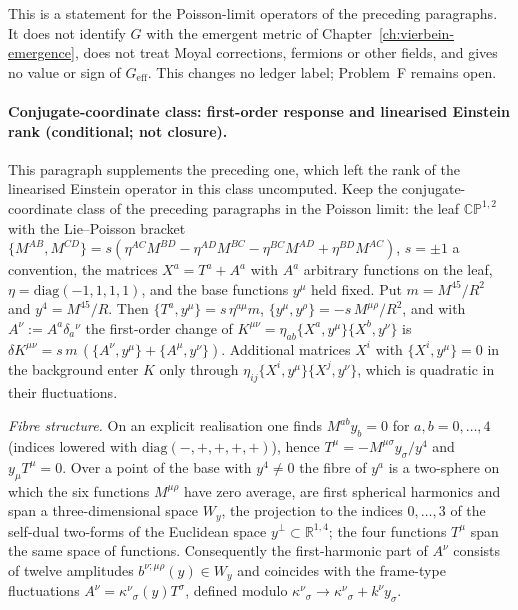 This is a statement for the Poisson-limit operators of the preceding paragraphs. It does not identify \(G\) with the emergent metric of Chapter~\ref{ch:vierbein-emergence}, does not treat Moyal corrections, fermions or other fields, and gives no value or sign of \(G_{\mathrm{eff}}\). This changes no ledger label; Problem~F remains open.

\paragraph{Conjugate-coordinate class: first-order response and linearised Einstein rank (conditional; not closure).}
This paragraph supplements the preceding one, which left the rank of the linearised Einstein operator in this class uncomputed. Keep the conjugate-coordinate class of the preceding paragraphs in the Poisson limit: the leaf \(\mathbb{CP}^{1,2}\) with the Lie--Poisson bracket \(\{M^{AB},M^{CD}\}=s(\eta^{AC}M^{BD}-\eta^{AD}M^{BC}-\eta^{BC}M^{AD}+\eta^{BD}M^{AC})\), \(s=\pm1\) a convention, the matrices \(X^a=T^a+A^a\) with \(A^a\) arbitrary functions on the leaf, \(\eta=\mathrm{diag}(-1,1,1,1)\), and the base functions \(y^\mu\) held fixed. Put \(m=M^{45}/R^2\) and \(y^4=M^{45}/R\). Then \(\{T^a,y^\mu\}=s\,\eta^{a\mu}m\), \(\{y^\mu,y^\rho\}=-s\,M^{\mu\rho}/R^2\), and with \(A^\nu:=A^a\delta_a{}^{\nu}\) the first-order change of \(K^{\mu\nu}=\eta_{ab}\{X^a,y^\mu\}\{X^b,y^\nu\}\) is \(\delta K^{\mu\nu}=s\,m\,(\{A^\nu,y^\mu\}+\{A^\mu,y^\nu\})\). Additional matrices \(X^i\) with \(\{X^i,y^\mu\}=0\) in the background enter \(K\) only through \(\eta_{ij}\{X^i,y^\mu\}\{X^j,y^\nu\}\), which is quadratic in their fluctuations.

\emph{Fibre structure.} On an explicit realisation one finds \(M^{ab}y_b=0\) for \(a,b=0,\dots,4\) (indices lowered with \(\mathrm{diag}(-,+,+,+,+)\)), hence \(T^\mu=-M^{\mu\sigma}y_\sigma/y^4\) and \(y_\mu T^\mu=0\). Over a point of the base with \(y^4\neq0\) the fibre of \(y^a\) is a two-sphere on which the six functions \(M^{\mu\rho}\) have zero average, are first spherical harmonics and span a three-dimensional space \(W_y\), the projection to the indices \(0,\dots,3\) of the self-dual two-forms of the Euclidean space \(y^\perp\subset\mathbb R^{1,4}\); the four functions \(T^\mu\) span the same space of functions. Consequently the first-harmonic part of \(A^\nu\) consists of twelve amplitudes \(b^{\nu;\mu\rho}(y)\in W_y\) and coincides with the frame-type fluctuations \(A^\nu=\kappa^\nu{}_\sigma(y)T^\sigma\), defined modulo \(\kappa^\nu{}_\sigma\to\kappa^\nu{}_\sigma+k^\nu y_\sigma\).

